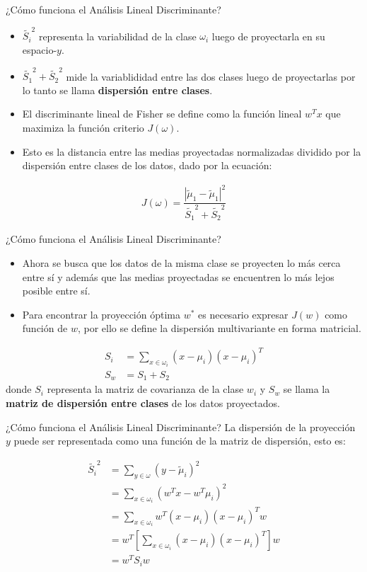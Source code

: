 \documentclass[11pt,aspectratio=169]{beamer}
\begin{document}
\begin{frame}{¿Cómo funciona el Análisis Lineal Discriminante?}
\begin{itemize}
	\item $\widetilde{S_i}^2$ representa la variabilidad de la clase $\omega_i$ luego de proyectarla en su espacio-$y$.\pause
	\item $\widetilde{S_1}^2 + \widetilde{S_2}^2$ mide la variablididad entre las dos clases luego de proyectarlas por lo tanto se 
		llama \textbf{dispersión entre clases}.\pause
	\item El discriminante lineal de Fisher se define como la función lineal $w^Tx$ que maximiza la función criterio $J(\omega)$. \pause
	\item Esto es la distancia entre las medias proyectadas normalizadas dividido por la dispersión entre clases de los datos, 
		dado por la ecuación: \pause
\end{itemize}
\begin{align}
	J(\omega) = \dfrac{|\widetilde{\mu}_1 - \widetilde{\mu}_1|^2}{\widetilde{S_1}^2 + \widetilde{S_2}^2}
	\label{eq:funcionJ}
\end{align}
\end{frame}

\begin{frame}{¿Cómo funciona el Análisis Lineal Discriminante?}
\begin{itemize}
	\item Ahora se busca que los datos de la misma clase se proyecten lo más cerca entre sí y además que las medias proyectadas se encuentren 
		lo más lejos posible entre sí.\pause
	\item Para encontrar la proyección óptima $w^*$ es necesario expresar $J(w)$ como función de $w$, por ello se define la dispersión
		multivariante en forma matricial.\pause
\end{itemize}

\begin{align*}
	S_i &= \sum_{x\in\omega_i} (x-\mu_i)(x-\mu_i)^T\\
	S_w &= S_1 + S_2
\end{align*}\pause
donde $S_i$ representa la matriz de covarianza de la clase $w_i$ y $S_w$ se llama la \textbf{matriz de dispersión entre clases} de los datos proyectados.
\end{frame}

\begin{frame}{¿Cómo funciona el Análisis Lineal Discriminante?}
La dispersión de la proyección $y$ puede ser representada como una función de la matriz de dispersión, esto es:\pause

\begin{align*}
	\widetilde{S_i}^2 &= \sum_{y\in\omega}(y-\widetilde{\mu}_i)^2\\
		&= \sum_{x\in\omega_i}(w^Tx-w^T\mu_i)^2\\
		&= \sum_{x\in\omega_i}w^T(x-\mu_i)(x-\mu_i)^Tw\\
		&= w^T\left[\sum_{x\in\omega_i}(x-\mu_i)(x-\mu_i)^T \right]w\\
		&= w^TS_iw
\end{align*}
\end{frame}
\end{document}
